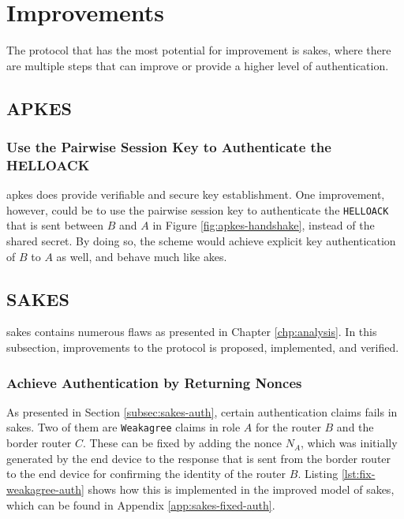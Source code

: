 \section{Improvements}

The protocol that has the most potential for improvement is \gls{sakes}, where there are multiple steps that can improve or provide a higher level of authentication.

\subsection{APKES}

\subsubsection{Use the Pairwise Session Key to Authenticate the HELLOACK}

\gls{apkes} does provide verifiable and secure key establishment. One improvement, however, could be to use the pairwise session key to authenticate the \texttt{HELLOACK} that is sent between $B$ and $A$ in Figure \ref{fig:apkes-handshake}, instead of the shared secret. By doing so, the scheme would achieve explicit key authentication of $B$ to $A$ as well, and behave much like \gls{akes}.



\subsection{SAKES}

\gls{sakes} contains numerous flaws as presented in Chapter \ref{chp:analysis}. In this subsection, improvements to the protocol is proposed, implemented, and verified.

\subsubsection{Achieve Authentication by Returning Nonces}

As presented in Section \ref{subsec:sakes-auth}, certain authentication claims fails in \gls{sakes}. Two of them are \texttt{Weakagree} claims in role $A$ for the router $B$ and the border router $C$. These can be fixed by adding the nonce $N_A$, which was initially generated by the end device to the response that is sent from the border router to the end device for confirming the identity of the router $B$. Listing \ref{lst:fix-weakagree-auth} shows how this is implemented in the improved model of \gls{sakes}, which can be found in Appendix \ref{app:sakes-fixed-auth}.\\

